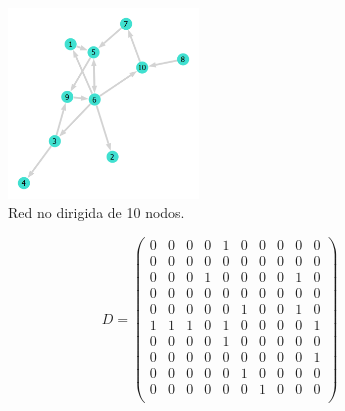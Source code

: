 \begin{figure} \vspace{-30pt} \begin{center}
		\includegraphics[width=0.45\textwidth]{../../Imagenes/Red10Dir} 
	\end{center} 
	\vspace{-20pt} 
	\caption{Red no dirigida de 10 nodos.} 
	\vspace{-120pt}
	\label{fig:Red10Dir}
\end{figure} 
$$
D = \begin{pmatrix}
	0 & 0 & 0 & 0 & 1 & 0 & 0 & 0 & 0 & 0\\
	0 & 0 & 0 & 0 & 0 & 0 & 0 & 0 & 0 & 0\\
	0 & 0 & 0 & 1 & 0 & 0 & 0 & 0 & 1 & 0\\
	0 & 0 & 0 & 0 & 0 & 0 & 0 & 0 & 0 & 0\\
	0 & 0 & 0 & 0 & 0 & 1 & 0 & 0 & 1 & 0\\
	1 & 1 & 1 & 0 & 1 & 0 & 0 & 0 & 0 & 1\\
	0 & 0 & 0 & 0 & 1 & 0 & 0 & 0 & 0 & 0\\
	0 & 0 & 0 & 0 & 0 & 0 & 0 & 0 & 0 & 1\\
	0 & 0 & 0 & 0 & 0 & 1 & 0 & 0 & 0 & 0\\
	0 & 0 & 0 & 0 & 0 & 0 & 1 & 0 & 0 & 0\\
\end{pmatrix}
$$


